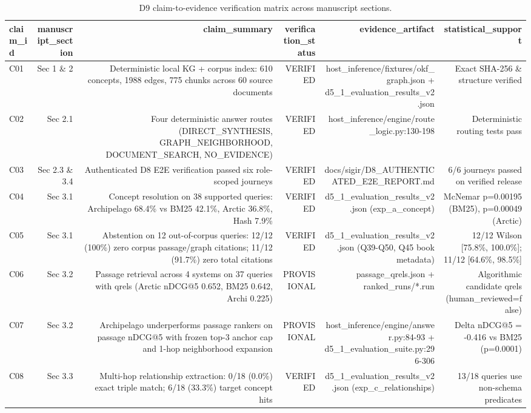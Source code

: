 \begin{table}[t]
\centering
\small
\caption{D9 claim-to-evidence verification matrix across manuscript sections.}
\label{tab:t7_claim_matrix}
\begin{tabular}{lrrrrr}
\toprule
\textbf{claim\_id} & \textbf{manuscript\_section} & \textbf{claim\_summary} & \textbf{verification\_status} & \textbf{evidence\_artifact} & \textbf{statistical\_support} \\
\midrule
C01 & Sec 1 \& 2 & Deterministic local KG + corpus index: 610 concepts, 1988 edges, 775 chunks across 60 source documents & VERIFIED & host\_inference/fixtures/okf\_graph.json + d5\_1\_evaluation\_results\_v2.json & Exact SHA-256 \& structure verified \\
C02 & Sec 2.1 & Four deterministic answer routes (DIRECT\_SYNTHESIS, GRAPH\_NEIGHBORHOOD, DOCUMENT\_SEARCH, NO\_EVIDENCE) & VERIFIED & host\_inference/engine/route\_logic.py:130-198 & Deterministic routing tests pass \\
C03 & Sec 2.3 \& 3.4 & Authenticated D8 E2E verification passed six role-scoped journeys & VERIFIED & docs/sigir/D8\_AUTHENTICATED\_E2E\_REPORT.md & 6/6 journeys passed on verified release \\
C04 & Sec 3.1 & Concept resolution on 38 supported queries: Archipelago 68.4\% vs BM25 42.1\%, Arctic 36.8\%, Hash 7.9\% & VERIFIED & d5\_1\_evaluation\_results\_v2.json (exp\_a\_concept) & McNemar p=0.00195 (BM25), p=0.00049 (Arctic) \\
C05 & Sec 3.1 & Abstention on 12 out-of-corpus queries: 12/12 (100\%) zero corpus passage/graph citations; 11/12 (91.7\%) zero total citations & VERIFIED & d5\_1\_evaluation\_results\_v2.json (Q39-Q50, Q45 book metadata) & 12/12 Wilson [75.8\%, 100.0\%]; 11/12 [64.6\%, 98.5\%] \\
C06 & Sec 3.2 & Passage retrieval across 4 systems on 37 queries with qrels (Arctic nDCG@5 0.652, BM25 0.642, Archi 0.225) & PROVISIONAL & passage\_qrels.json + ranked\_runs/*.run & Algorithmic candidate qrels (human\_reviewed=false) \\
C07 & Sec 3.2 & Archipelago underperforms passage rankers on passage nDCG@5 with frozen top-3 anchor cap and 1-hop neighborhood expansion & PROVISIONAL & host\_inference/engine/answer.py:84-93 + d5\_1\_evaluation\_suite.py:296-306 & Delta nDCG@5 = -0.416 vs BM25 (p=0.0001) \\
C08 & Sec 3.3 & Multi-hop relationship extraction: 0/18 (0.0\%) exact triple match; 6/18 (33.3\%) target concept hits & VERIFIED & d5\_1\_evaluation\_results\_v2.json (exp\_c\_relationships) & 13/18 queries use non-schema predicates \\

\end{tabular}
\end{table}
